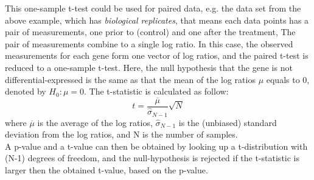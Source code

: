 This one-sample t-test could be used for paired data, e.g. the data set from the above example, which has {\it biological replicates}, that means each data points has a pair of measurements, one prior to (control) and one after the treatment, The pair of measurements combine to a single log ratio. In this case, the observed measurements for each gene form one vector of log ratios, and the paired t-test is reduced to a one-sample t-test. Here, the null hypothesis that the gene is not differential-expressed is the same as that the mean of the log ratios $\mu$ equals to 0, denoted by $H_0: \mu = 0$. The t-statistic is calculated as follow:
\begin{equation}
	t = \frac{\overline \mu}{\hat{\sigma}_{N-1}}\sqrt{N} \nonumber
\end{equation}
where $\overline \mu$ is the average of the log ratios, $\hat{\sigma}_{N-1}$ is the (unbiased) standard deviation from the log ratios, and N is the number of samples.\\
A p-value and a t-value can then be obtained by looking up a t-distribution with (N-1) degrees of freedom, and the null-hypothesis is rejected if the t-statistic is larger then the obtained t-value, based on the p-value.

